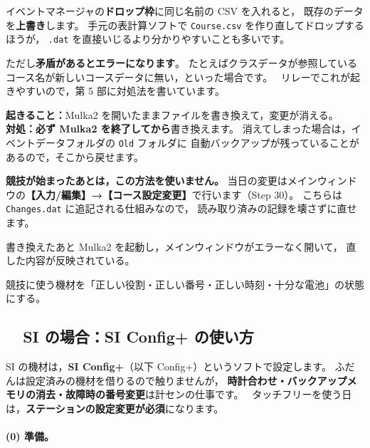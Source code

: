 \begin{Note}[ドロップで上書きする方法もある]
イベントマネージャの\textbf{ドロップ枠}に同じ名前の CSV を入れると，
既存のデータを\textbf{上書き}します。
手元の表計算ソフトで \texttt{Course.csv} を作り直してドロップするほうが，
\texttt{.dat} を直接いじるより分かりやすいことも多いです。

ただし\textbf{矛盾があるとエラーになります}。
たとえばクラスデータが参照しているコース名が新しいコースデータに無い，といった場合です。
\tRELAY\ リレーでこれが起きやすいので，第 5 部に対処法を書いています。
\end{Note}

\begin{Fail}
\textbf{起きること：}Mulka2 を開いたままファイルを書き換えて，変更が消える。\\
\textbf{対処：}\textbf{必ず Mulka2 を終了してから}書き換えます。
消えてしまった場合は，イベントデータフォルダの \texttt{Old} フォルダに
自動バックアップが残っていることがあるので，そこから戻せます。

\textbf{競技が始まったあとは，この方法を使いません。}
当日の変更はメインウィンドウの\textbf{【入力/編集】→【コース設定変更】}で行います（Step 30）。
こちらは\texttt{Changes.dat} に追記される仕組みなので，
読み取り済みの記録を壊さずに直せます。
\end{Fail}

\begin{Done}
書き換えたあと Mulka2 を起動し，メインウィンドウがエラーなく開いて，
直した内容が反映されている。
\end{Done}

\begin{Goal}
競技に使う機材を「正しい役割・正しい番号・正しい時刻・十分な電池」の状態にする。
\end{Goal}

\subsection*{\tSI\ \tSIAC\ SI の場合：SI Config+ の使い方}

SI の機材は，\textbf{SI Config+}（以下 Config+）というソフトで設定します。
ふだんは設定済みの機材を借りるので触りませんが，
\textbf{時計合わせ・バックアップメモリの消去・故障時の番号変更}は計センの仕事です。
\tSIAC\ タッチフリーを使う日は，\textbf{ステーションの設定変更が必須}になります。

\paragraph{(0) 準備。}

